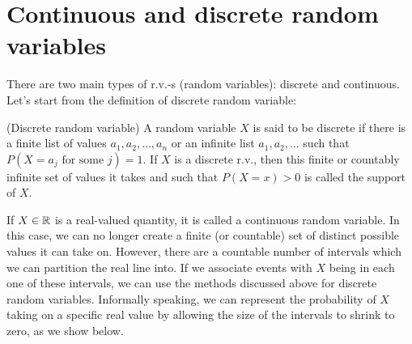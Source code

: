 \section{Continuous and discrete random variables}
\par
There are two main types of r.v.-s (random variables): discrete and continuous. Let's start from the definition of discrete random variable:
\begin{definition}{(Discrete random variable)}{}
    A random variable $X$ is said to be discrete if there is a finite list of values $a_1, a_2, \ldots, a_n$ or an infinite list $a_1, a_2, \ldots$ such that $P(X = a_j \text{ for some } j) = 1$. If $X$ is a discrete r.v., then this finite or countably infinite set of values it takes and such that $P(X = x) > 0$ is called the support of $X$.
\end{definition}


If $X \in \mathbb{R}$  is a real-valued quantity, it is called a continuous random variable. In this case, we can
no longer create a finite (or countable) set of distinct possible values it can take on. However, there
are a countable number of intervals which we can partition the real line into. If we associate events
with $X$ being in each one of these intervals, we can use the methods discussed above for discrete
random variables. Informally speaking, we can represent the probability of $X$ taking on a specific
real value by allowing the size of the intervals to shrink to zero, as we show below.